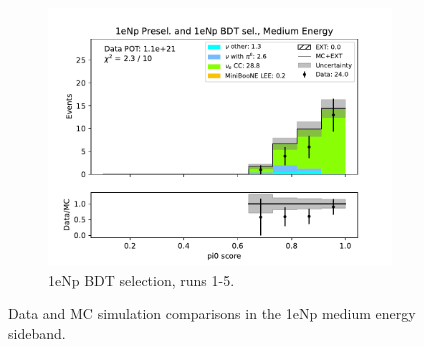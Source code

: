 \begin{figure}[H]
\begin{subfigure}{0.33\linewidth}
        \includegraphics[width=\linewidth]{technote/Sidebands/Figures/NearSideband/near_sideband_pi0_score_run1234b4c4d5_NP_NPBDT_MEDIUM_ENERGY.pdf}
        \caption{1eNp BDT selection, runs 1-5.}
    \end{subfigure}
    \caption{Data and MC simulation comparisons in the 1eNp medium energy sideband.}
\end{figure}

